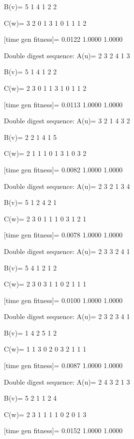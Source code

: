 B(v)=
     5     1     4     1     2     2

C(w)=
     3     2     0     1     3     1     0     1     1     1     2

[time gen fitness]=
    0.0122    1.0000    1.0000

Double digest sequence:
A(u)=
     2     3     2     4     1     3

B(v)=
     5     1     4     1     2     2

C(w)=
     2     3     0     1     1     3     1     0     1     1     2

[time gen fitness]=
    0.0113    1.0000    1.0000

Double digest sequence:
A(u)=
     3     2     1     4     3     2

B(v)=
     2     2     1     4     1     5

C(w)=
     2     1     1     1     0     1     3     1     0     3     2

[time gen fitness]=
    0.0082    1.0000    1.0000

Double digest sequence:
A(u)=
     2     3     2     1     3     4

B(v)=
     5     1     2     4     2     1

C(w)=
     2     3     0     1     1     1     0     3     1     2     1

[time gen fitness]=
    0.0078    1.0000    1.0000

Double digest sequence:
A(u)=
     2     3     3     2     4     1

B(v)=
     5     4     1     2     1     2

C(w)=
     2     3     0     3     1     1     0     2     1     1     1

[time gen fitness]=
    0.0100    1.0000    1.0000

Double digest sequence:
A(u)=
     2     3     2     3     4     1

B(v)=
     1     4     2     5     1     2

C(w)=
     1     1     3     0     2     0     3     2     1     1     1

[time gen fitness]=
    0.0087    1.0000    1.0000

Double digest sequence:
A(u)=
     2     4     3     2     1     3

B(v)=
     5     2     1     1     2     4

C(w)=
     2     3     1     1     1     1     0     2     0     1     3

[time gen fitness]=
    0.0152    1.0000    1.0000

